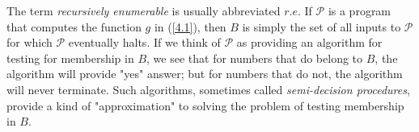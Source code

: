 \documentclass[12pt,a4paper,twoside,openany]{book}
\begin{document}
The term \textit{recursively enumerable} is usually abbreviated $r.e$. If $\mathscr{P}$ is a program that computes the function $g$ in (\ref{4.1}), then $B$ is simply the set of all inputs to $\mathscr{P}$ for which $\mathscr{P}$ eventually halts. If we think of $\mathscr{P}$ as providing an algorithm for testing for membership in $B$, we see that for numbers that do belong to $B$, the algorithm will provide "yes" answer; but for numbers that do not, the algorithm will never terminate. Such algorithms, sometimes called \textit{semi-decision procedures}, provide a kind of "approximation" to solving the problem of testing membership in $B$.


\end{document}

